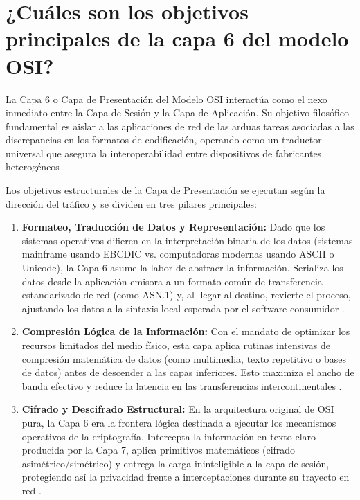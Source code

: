 \documentclass[a4paper,12pt]{article}
\begin{document}
\section{¿Cuáles son los objetivos principales de la capa 6 del modelo OSI?}

La Capa 6 o Capa de Presentación del Modelo OSI interactúa como el nexo inmediato entre la Capa de Sesión y la Capa de Aplicación. Su objetivo filosófico fundamental es aislar a las aplicaciones de red de las arduas tareas asociadas a las discrepancias en los formatos de codificación, operando como un traductor universal que asegura la interoperabilidad entre dispositivos de fabricantes heterogéneos \cite{proofpoint_osi}. 

Los objetivos estructurales de la Capa de Presentación se ejecutan según la dirección del tráfico y se dividen en tres pilares principales:
\begin{enumerate}
    \item \textbf{Formateo, Traducción de Datos y Representación:} Dado que los sistemas operativos difieren en la interpretación binaria de los datos (sistemas mainframe usando EBCDIC vs. computadoras modernas usando ASCII o Unicode), la Capa 6 asume la labor de abstraer la información. Serializa los datos desde la aplicación emisora a un formato común de transferencia estandarizado de red (como ASN.1) y, al llegar al destino, revierte el proceso, ajustando los datos a la sintaxis local esperada por el software consumidor \cite{aws_osi_model}.
    \item \textbf{Compresión Lógica de la Información:} Con el mandato de optimizar los recursos limitados del medio físico, esta capa aplica rutinas intensivas de compresión matemática de datos (como multimedia, texto repetitivo o bases de datos) antes de descender a las capas inferiores. Esto maximiza el ancho de banda efectivo y reduce la latencia en las transferencias intercontinentales \cite{proofpoint_osi}.
    \item \textbf{Cifrado y Descifrado Estructural:} En la arquitectura original de OSI pura, la Capa 6 era la frontera lógica destinada a ejecutar los mecanismos operativos de la criptografía. Intercepta la información en texto claro producida por la Capa 7, aplica primitivos matemáticos (cifrado asimétrico/simétrico) y entrega la carga ininteligible a la capa de sesión, protegiendo así la privacidad frente a interceptaciones durante su trayecto en red \cite{proofpoint_osi}.
\end{enumerate}
\end{document}

